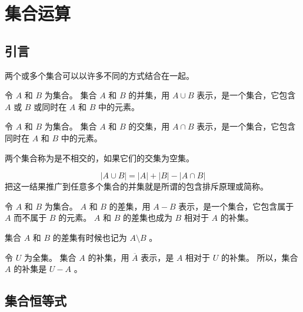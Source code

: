 
\section{集合运算}
{
    \subsection{引言}
    {
        两个或多个集合可以以许多不同的方式结合在一起。

        \begin{defines}
            令 $A$ 和 $B$ 为集合。
            集合 $A$ 和 $B$ 的并集，用 $A \cup B$ 表示，是一个集合，它包含 $A$ 或 $B$ 或同时在 $A$ 和 $B$ 中的元素。
        \end{defines}

        \begin{defines}
            令 $A$ 和 $B$ 为集合。
            集合 $A$ 和 $B$ 的交集，用 $A \cap B$ 表示，是一个集合，它包含同时在 $A$ 和 $B$ 中的元素。
        \end{defines}

        \begin{defines}
            两个集合称为是不相交的，如果它们的交集为空集。
        \end{defines}

        $$|A \cup B| = |A| + |B| - |A \cap B|$$
        把这一结果推广到任意多个集合的并集就是所谓的包含排斥原理或简称。

        \begin{defines}
            令 $A$ 和 $B$ 为集合。
            $A$ 和 $B$ 的差集，用 $A - B$ 表示，是一个集合，它包含属于 $A$ 而不属于 $B$ 的元素。
            $A$ 和 $B$ 的差集也成为 $B$ 相对于 $A$ 的补集。
        \end{defines}

        \begin{defines}
            集合 $A$ 和 $B$ 的差集有时候也记为 $A \setminus B$ 。
        \end{defines}

        \begin{defines}
            令 $U$ 为全集。
            集合 $A$ 的补集，用 $\overline{A}$ 表示，是 $A$ 相对于 $U$ 的补集。
            所以，集合 $A$ 的补集是 $U - A$ 。
        \end{defines}
    }

    \subsection{集合恒等式}
    {
        \begin{table}[htb]
            \centering


\end{table}}}
